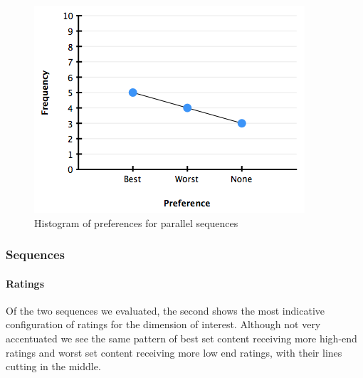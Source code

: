 \begin{figure}[htbp]
  \centering
    \includegraphics[width=.6\textwidth]{img/evaluation/pref_parallel}
  \caption{Histogram of preferences for parallel sequences}
  \label{fig:evalPrefParallel}
\end{figure}

\subsubsection{Sequences}
\paragraph{Ratings} Of the two sequences we evaluated, the second shows the most indicative configuration of ratings for the dimension of interest. Although not very accentuated we see the same pattern of best set content receiving more high-end ratings and worst set content receiving more low end ratings, with their lines cutting in the middle. 

